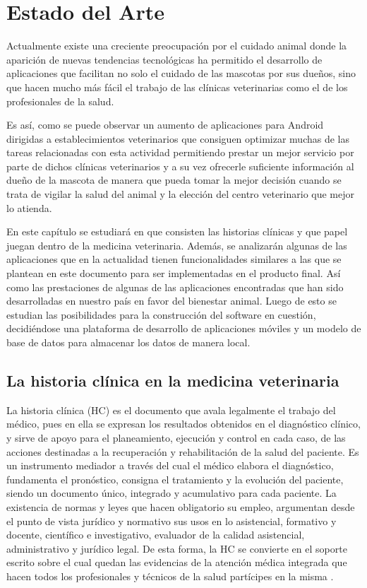 
\chapter{Estado del Arte}\label{chapter:introduction}

Actualmente existe una creciente preocupación por el cuidado animal donde la aparición de nuevas tendencias tecnológicas ha permitido el desarrollo de aplicaciones que facilitan no solo el cuidado de las mascotas por sus dueños, sino que hacen mucho más fácil el trabajo de las clínicas veterinarias como el de los profesionales de la salud.

Es así, como se puede observar un aumento de aplicaciones para Android dirigidas a establecimientos veterinarios que consiguen optimizar muchas de las tareas relacionadas con esta actividad permitiendo prestar un mejor servicio por parte de dichos clínicas veterinarios y a su vez ofrecerle suficiente información al dueño de la mascota de manera que pueda tomar la mejor decisión cuando se trata de vigilar la salud del animal y la elección del centro veterinario que mejor lo atienda.

En este capítulo se estudiará en que consisten las historias clínicas y que papel juegan dentro de la medicina veterinaria. Además, se analizarán algunas de las aplicaciones que en la actualidad tienen funcionalidades similares a las que se plantean en este documento para ser implementadas en el producto final. Así como las prestaciones de algunas de las aplicaciones encontradas que han sido desarrolladas en nuestro país en favor del bienestar animal. Luego de esto se estudian las posibilidades para la construcción del software en cuestión, decidiéndose una plataforma de desarrollo de aplicaciones móviles y un modelo de base de datos para almacenar los datos de manera local.\newpage


\section{La historia clínica en la medicina veterinaria}

La historia clínica (HC) es el documento que avala legalmente el trabajo del médico, pues en ella se expresan los resultados obtenidos en el diagnóstico clínico, y sirve de apoyo para el planeamiento, ejecución y control en cada caso, de las acciones destinadas a la recuperación y rehabilitación de la salud del paciente. Es un instrumento mediador a través del cual el médico elabora el diagnóstico, fundamenta el pronóstico, consigna el tratamiento y la evolución del paciente, siendo un documento único, integrado y acumulativo para cada paciente. La existencia de normas y leyes que hacen obligatorio su empleo, argumentan desde el punto de vista jurídico y normativo sus usos en lo asistencial, formativo y docente, científico e investigativo, evaluador de la calidad asistencial, administrativo y jurídico legal. De esta forma, la HC se convierte en el soporte escrito sobre el cual quedan las evidencias de la atención médica integrada que hacen todos los profesionales y técnicos de la salud partícipes en la misma . 

